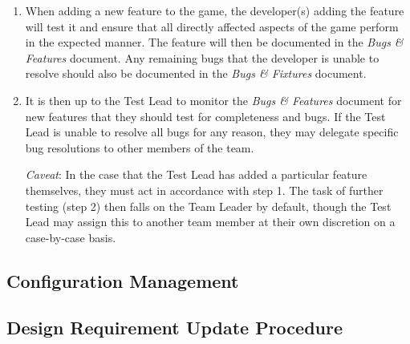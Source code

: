 \documentclass[12pt,titlepage]{article}
\begin{document}
\begin{enumerate}
\item When adding a new feature to the game, the developer(s) adding the feature
      will test it and ensure that all directly affected aspects of the game
      perform in the expected manner. The feature will then be documented in the
      {\it Bugs \& Features} document. Any remaining bugs that the developer is
      unable to resolve should also be documented in the {\it Bugs \& Fixtures}
      document.
\item It is then up to the Test Lead to monitor the {\it Bugs \& Features}
      document for new features that they should test for completeness and bugs.
      If the Test Lead is unable to resolve all bugs for any reason, they may
      delegate specific bug resolutions to other members of the team.

      {\it Caveat}: In the case that the Test Lead has added a particular
      feature themselves, they must act in accordance with step 1. The task of
      further testing (step 2) then falls on the Team Leader by default, though
      the Test Lead may assign this to another team member at their own
      discretion on a case-by-case basis.
\end{enumerate}

\subsection{Configuration Management}

\subsection{Design Requirement Update Procedure}
\end{document}
